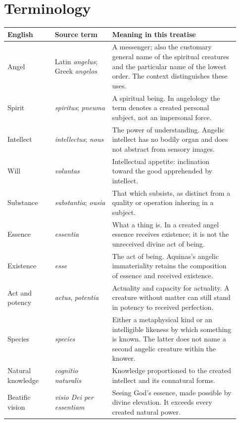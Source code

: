 \section{Terminology}
\label{app:terms}

\begin{longtable}{@{}>{\raggedright\arraybackslash}p{0.19\linewidth}>{\raggedright\arraybackslash}p{0.23\linewidth}>{\raggedright\arraybackslash}p{0.51\linewidth}@{}}
\toprule
English & Source term & Meaning in this treatise\\
\midrule\endhead
Angel & Latin \emph{angelus}; Greek \emph{angelos} & A messenger; also the
customary general name of the spiritual creatures and the particular name
of the lowest order. The context distinguishes these uses.\\
Spirit & \emph{spiritus}; \emph{pneuma} & A spiritual being. In angelology
the term denotes a created personal subject, not an impersonal force.\\
Intellect & \emph{intellectus}; \emph{nous} & The power of understanding.
Angelic intellect has no bodily organ and does not abstract from sensory images.\\
Will & \emph{voluntas} & Intellectual appetite: inclination toward the
good apprehended by intellect.\\
Substance & \emph{substantia}; \emph{ousia} & That which subsists, as
distinct from a quality or operation inhering in a subject.\\
Essence & \emph{essentia} & What a thing is. In a created angel essence
receives existence; it is not the unreceived divine act of being.\\
Existence & \emph{esse} & The act of being. Aquinas's angelic immateriality
retains the composition of essence and received existence.\\
Act and potency & \emph{actus}, \emph{potentia} & Actuality and capacity
for actuality. A creature without matter can still stand in potency to
received perfection.\\
Species & \emph{species} & Either a metaphysical kind or an intelligible
likeness by which something is known. The latter does not name a second
angelic creature within the knower.\\
Natural knowledge & \emph{cognitio naturalis} & Knowledge proportioned
to the created intellect and its connatural forms.\\
Beatific vision & \emph{visio Dei per essentiam} & Seeing God's essence,
made possible by divine elevation. It exceeds every created natural power.\\

\end{longtable}
